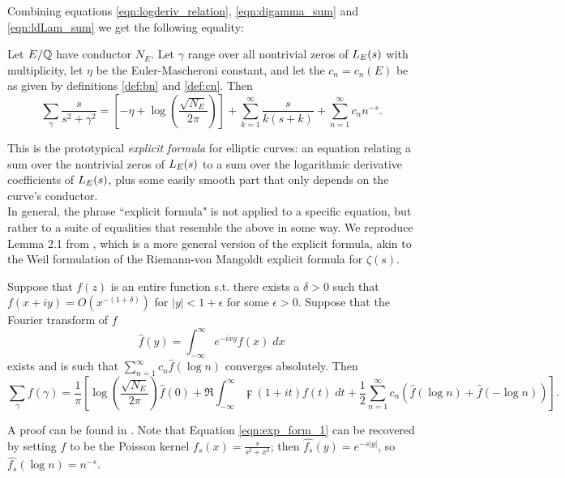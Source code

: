 Combining equations \ref{eqn:logderiv_relation}, \ref{eqn:digamma_sum} and \ref{eqn:ldLam_sum} we get the following equality:
\begin{proposition}[GRH]
Let $E/\mathbb{Q}$ have conductor $N_E$. Let $\gamma$ range over all nontrivial zeros of $L_E(s)$ with multiplicity, let $\eta$ be the Euler-Mascheroni constant, and let the $c_n = c_n(E)$ be as given by definitions \ref{def:bn} and \ref{def:cn}. Then
\begin{equation}\label{eqn:exp_form_1}
\sum_{\gamma} \frac{s}{s^2 + \gamma^2} = \left[-\eta + \log\left(\frac{\sqrt{N_E}}{2\pi}\right)\right] + \sum_{k=1}^{\infty} \frac{s}{k(s+k)} + \sum_{n=1}^{\infty} c_n n^{-s}.
\end{equation}
\end{proposition}
This is the prototypical {\it explicit formula} for elliptic curves: an equation relating a sum over the nontrivial zeros of $L_E(s)$ to a sum over the logarithmic derivative coefficients of $L_E(s)$, plus some easily smooth part that only depends on the curve's conductor. \\

In general, the phrase ``explicit formula" is not applied to a specific equation, but rather to a suite of equalities that resemble the above in some way. We reproduce Lemma 2.1 from \cite{Bob-2011}, which is a more general version of the explicit formula, akin to the Weil formulation of the Riemann-von Mangoldt explicit formula for $\zeta(s)$.
\begin{lemma}[GRH]
\label{lem:exp_form_2}
Suppose that $f(z)$ is an entire function s.t. there exists a $\delta>0$ such that $f(x+iy) = O(x^{-(1+\delta)})$ for $|y|<1+\epsilon$ for some $\epsilon>0$. Suppose that the Fourier transform of $f$
\begin{equation}
\hat{f}(y) = \int_{-\infty}^{\infty} e^{-i x y}f(x)\; dx
\end{equation}
exists and is such that $\sum_{n=1}^{\infty} c_n \hat{f}\left(\log n\right)$ converges absolutely. Then
\begin{equation}\label{eqn:exp_form_2}
\sum_{\gamma} f(\gamma) = \frac{1}{\pi}\left[\log\left(\frac{\sqrt{N_E}}{2\pi}\right)\hat{f}(0) + \Re\int_{-\infty}^{\infty} \digamma(1+it)f(t) \; dt  + \frac{1}{2} \sum_{n=1}^{\infty} c_n \left( \hat{f}\left(\log n\right) + \hat{f}\left(-\log n\right)\right) \right].
\end{equation}
\end{lemma}
A proof can be found in \cite[Theorem 5.12]{IwKo-2004}. Note that Equation \ref{eqn:exp_form_1} can be recovered by setting $f$ to be the Poisson kernel $f_s(x) = \frac{s}{s^2+x^2}$; then $\hat{f_s}(y) = e^{-s|y|}$, so $\hat{f_s}(\log n) = n^{-s}$. \\


